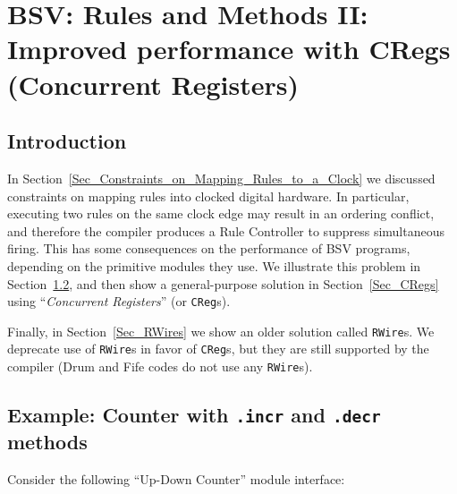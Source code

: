 

\chapter{BSV: Rules and Methods II: Improved performance with CRegs (Concurrent Registers)}


\setcounter{page}{1}
\renewcommand{\thepage}{\arabic{chapter}-\arabic{page}}

\label{ch_Rules_II}


\section{Introduction}

In Section~\ref{Sec_Constraints_on_Mapping_Rules_to_a_Clock} we
discussed constraints on mapping rules into clocked digital hardware.
In particular, executing two rules on the same clock edge may result
in an ordering conflict, and therefore the compiler produces a Rule
Controller to suppress simultaneous firing.  This has some
consequences on the performance of BSV programs, depending on the
primitive modules they use.  We illustrate this problem in
Section~\ref{Sec_Up_Down_Counter}, and then show a general-purpose
solution in Section~\ref{Sec_CRegs} using ``\emph{Concurrent
Registers}'' (or \verb|CReg|s).

Finally, in Section~\ref{Sec_RWires} we show an older solution called
\verb|RWire|s.  We deprecate use of \verb|RWire|s in favor of
\verb|CReg|s, but they are still supported by the compiler (Drum and
Fife codes do not use any \verb|RWire|s).


\section{Example: Counter with {\tt .incr} and {\tt .decr} methods}

\label{Sec_Up_Down_Counter}

Consider the following ``Up-Down Counter'' module interface:

